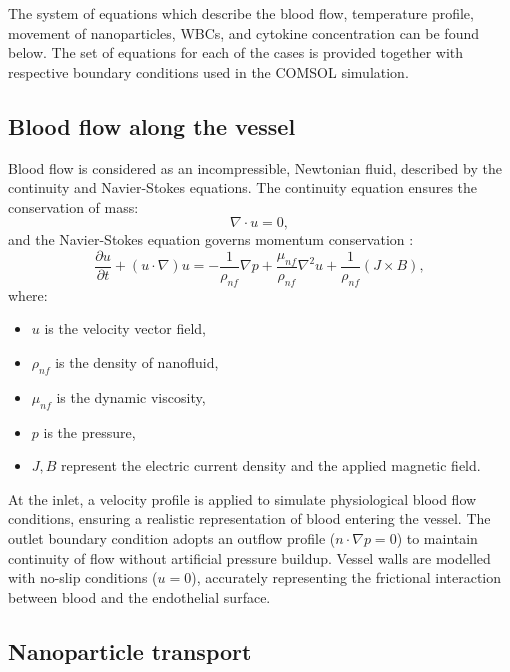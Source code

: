\documentclass[10pt]{NSP1}
\begin{document}
	The system of equations which describe the blood flow, temperature profile, movement of nanoparticles, WBCs, and cytokine concentration can be found below. The set of equations for each of the cases is provided together with respective boundary conditions used in the COMSOL simulation.
	
	\subsection{Blood flow along the vessel}
	\label{sec:bloodflow}
	
	Blood flow is considered as an incompressible, Newtonian fluid, described by the continuity and Navier-Stokes equations. The continuity equation ensures the conservation of mass:
	\begin{equation}\label{eq:continuity}
		\nabla\cdot u = 0,
	\end{equation}
	and the Navier-Stokes equation governs momentum conservation \cite{Ku1997,Steinman2004}:
	\begin{equation}\label{eq:navierstokes}
		\frac{\partial u}{\partial t} + (u\cdot\nabla)u = - \frac{1}{\rho_{nf}}\nabla p + \frac{\mu_{nf}}{\rho_{nf}}\nabla^{2}u + \frac{1}{\rho_{nf}}(J \times B),
	\end{equation}
	where:
	\begin{itemize}
		\item $u$ is the velocity vector field,
		\item $\rho_{nf}$ is the density of nanofluid,
		\item $\mu_{nf}$ is the dynamic viscosity,
		\item $p$ is the pressure,
		\item $J,B$ represent the electric current density and the applied magnetic field.
	\end{itemize}
	
	At the inlet, a velocity profile is applied to simulate physiological blood flow conditions, ensuring a realistic representation of blood entering the vessel. The outlet boundary condition adopts an outflow profile ($n \cdot \nabla p = 0$) to maintain continuity of flow without artificial pressure buildup. Vessel walls are modelled with no-slip conditions ($u = 0$), accurately representing the frictional interaction between blood and the endothelial surface.
	
	\subsection{Nanoparticle transport}
	\label{sec:nanoparticle}
	
\end{document}
